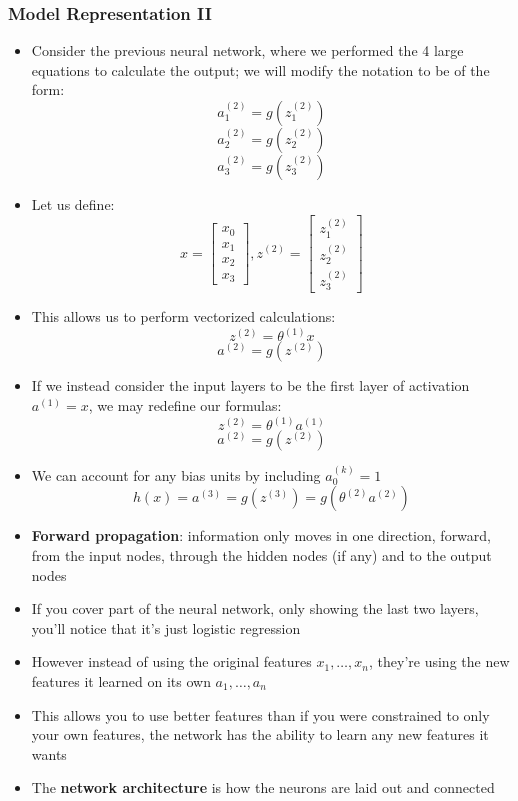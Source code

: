 \subsubsection{Model Representation II}
\begin{itemize}[--]
	\item Consider the previous neural network, where we performed the 4 large equations to calculate the output; we will modify the notation to be of the form:
		$$a_1^{(2)}=g(z_1^{(2)})$$
		$$a_2^{(2)}=g(z_2^{(2)})$$
		$$a_3^{(2)}=g(z_3^{(2)})$$
	\item Let us define:
		$$x=\begin{bmatrix}
			x_0 \\ x_1 \\ x_2 \\ x_3
		\end{bmatrix}, z^{(2)}=\begin{bmatrix}
			z^{(2)}_1 \\ z^{(2)}_2 \\ z^{(2)}_3
		\end{bmatrix}$$
	\item This allows us to perform vectorized calculations:
		$$z^{(2)}=\theta^{(1)}x$$
		$$a^{(2)}=g(z^{(2)})$$
	\item If we instead consider the input layers to be the first layer of activation $a^{(1)}=x$, we may redefine our formulas:
		$$z^{(2)}=\theta^{(1)}a^{(1)}$$
		$$a^{(2)}=g(z^{(2)})$$
	\item We can account for any bias units by including $a_0^{(k)}=1$
		$$h(x)=a^{(3)}=g(z^{(3)})=g(\theta^{(2)}a^{(2)})$$
	\item \textbf{Forward propagation}: information only moves in one direction, forward, from the input nodes, through the hidden nodes (if any) and to the output nodes
	\item If you cover part of the neural network, only showing the last two layers, you'll notice that it's just logistic regression
	\item However instead of using the original features $x_1, \ldots, x_n$, they're using the new features it learned on its own $a_1, \ldots, a_n$
	\item This allows you to use better features than if you were constrained to only your own features, the network has the ability to learn any new features it wants
	\item The \textbf{network architecture} is how the neurons are laid out and connected
\end{itemize}

